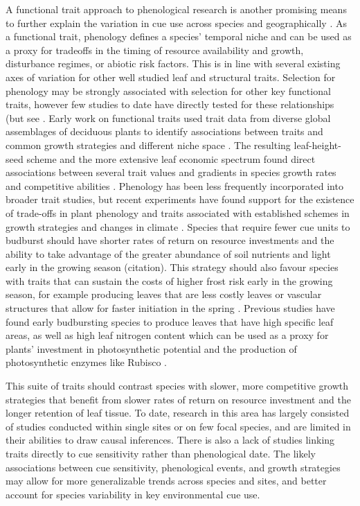 \documentclass{article}\usepackage[]{graphicx}\usepackage[]{color}
\begin{document}
A functional trait approach to phenological research is another promising means to further explain the variation in cue use across species and geographically \citep{Flynn2018,Osada2017}. As a functional trait, phenology defines a species' temporal niche and can be used as a proxy for tradeoffs in the timing of resource availability and growth, disturbance regimes, or abiotic risk factors. This is in line with several existing axes of variation for other well studied leaf and structural traits. Selection for phenology may be strongly associated with selection for other key functional traits, however few studies to date have directly tested for these relationships (but see \citep{Osada2017,Sun2006,Lechowicz1984}. Early work on functional traits used trait data from diverse global assemblages of deciduous plants to identify associations between traits and common growth strategies and different niche space \citep{Westoby1998,Wright2004,Chave2009}. The resulting leaf-height-seed scheme and the more extensive leaf economic spectrum found direct associations between several trait values and gradients in species growth rates and competitive abilities \citep{Westoby1998,Wright2004,Diaz2016,Chave2009,Funk2016}. Phenology has been less frequently incorporated into broader trait studies, but recent experiments have found support for the existence of trade-offs in plant phenology and traits associated with established schemes in growth strategies and changes in climate \citep{Suzuki1997,Ishioka2013}. Species that require fewer cue units to budburst should have shorter rates of return on resource investments and the ability to take advantage of the greater abundance of soil nutrients and light early in the growing season (citation). This strategy should also favour species with traits that can sustain the costs of higher frost risk early in the growing season, for example producing leaves that are less costly leaves or vascular structures that allow for faster initiation in the spring \citep{Lechowicz1984,Lenz2016}. Previous studies have found early budbursting species to produce leaves that have high specific leaf areas, as well as high leaf nitrogen content which can be used as a proxy for plants' investment in photosynthetic potential and the production of photosynthetic enzymes like Rubisco \citep{Pereira2020}.  %

This suite of traits should contrast species with slower, more competitive growth strategies that benefit from slower rates of return on resource investment and the longer retention of leaf tissue. To date, research in this area has largely consisted of studies conducted within single sites or on few focal species, and are limited in their abilities to draw causal inferences. There is also a lack of studies linking traits directly to cue sensitivity rather than phenological date. The likely associations between cue sensitivity, phenological events, and growth strategies may allow for more generalizable trends across species and sites, and better account for species variability in key environmental cue use. \\
 
\end{document}
